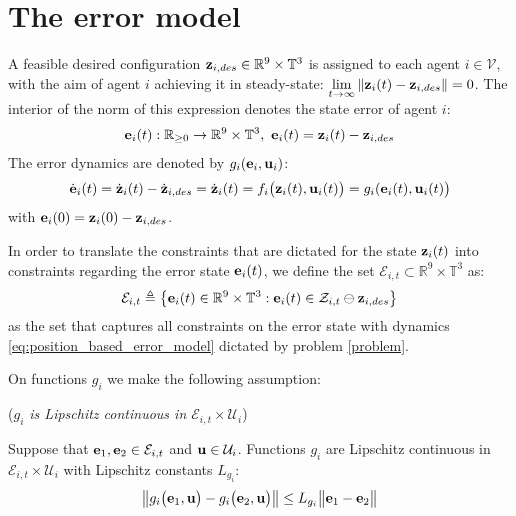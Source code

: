 \section{The error model}

A feasible desired configuration
$\bm{\mathbf{z}}_{i,des} \in \mathbb{R}^9 \times \mathbb{T}^3$
is assigned to each agent $i \in \mathcal{V}$, with the aim of agent $i$
achieving it in steady-state:
$\lim\limits_{t \to \infty} \|\bm{\mathbf{z}}_i(t) - \bm{\mathbf{z}}_{i,des}\| = 0$. The
interior of the norm of this expression denotes the state error of agent $i$:
\begin{align}
  \bm{\mathbf{e}}_i(t) : \mathbb{R}_{\geq 0} \to \mathbb{R}^9 \times \mathbb{T}^3,\
  \bm{\mathbf{e}}_i(t) = \bm{\mathbf{z}}_i(t) - \bm{\mathbf{z}}_{i,des}
\end{align}
The error dynamics are denoted by $g_i(\bm{\mathbf{e}}_i, \bm{\mathbf{u}}_i)$:
\begin{align}
  \dot{\bm{\mathbf{e}}}_i(t) = \dot{\bm{\mathbf{z}}}_i(t) - \dot{\bm{\mathbf{z}}}_{i,des} =
  \dot{\bm{\mathbf{z}}}_i(t) = f_i\big(\bm{\mathbf{z}}_i(t), \bm{\mathbf{u}}_i(t)\big) = g_i(\bm{\mathbf{e}}_i(t), \bm{\mathbf{u}}_i(t)\big)
  \label{eq:position_based_error_model}
\end{align}
with $\bm{\mathbf{e}}_i(0) = \bm{\mathbf{z}}_i(0) - \bm{\mathbf{z}}_{i,des}$.

In order to translate
the constraints that are dictated for the state $\bm{\mathbf{z}}_i(t)$ into constraints
regarding the error state $\bm{\mathbf{e}}_i(t)$, we define the set
$\mathcal{E}_{i,t} \subset \mathbb{R}^9 \times \mathbb{T}^3$ as:
$$\mathcal{E}_{i,t} \triangleq \big\{\bm{\mathbf{e}}_i(t) \in \mathbb{R}^9 \times \mathbb{T}^3 :
\bm{\mathbf{e}}_i(t) \in \mathcal{Z}_{i,t} \ominus \bm{\mathbf{z}}_{i,des}\big\}$$
as the set that captures all constraints on the error state with dynamics
\eqref{eq:position_based_error_model} dictated by problem \eqref{problem}.

On functions $g_i$ we make the following assumption:\\[1ex]
\begin{bw_box}
  \begin{assumption} (\textit{$g_i$ is Lipschitz continuous in $\mathcal{E}_{i,t} \times \mathcal{U}_i$})
  \label{ass:g_i_Lipschitz}

  Suppose that $\bm{\mathbf{e}}_1, \bm{\mathbf{e}}_2 \in \mathcal{E}_{i,t}$ and
  $\bm{\mathbf{u}} \in \mathcal{U}_i$. Functions $g_i$ are Lipschitz continuous in
  $\mathcal{E}_{i,t} \times \mathcal{U}_i$ with Lipschitz constants $L_{g_i}$:
  \begin{align}
    \big\|g_i\big(\bm{\mathbf{e}}_1, \bm{\mathbf{u}} \big) - g_i\big(\bm{\mathbf{e}}_2, \bm{\mathbf{u}} \big)\big\|
      \leq L_{g_i} \big\|\bm{\mathbf{e}}_1 - \bm{\mathbf{e}}_2\big\|
  \end{align}

\end{assumption}
\end{bw_box}

